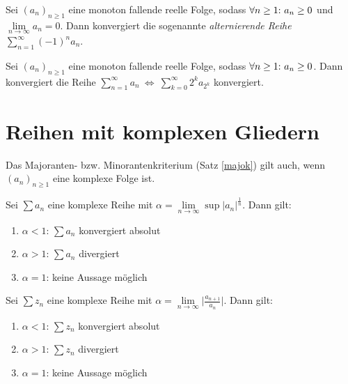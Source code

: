 \begin{framedthm}
	Sei $(a_n)_{n\geq 1}$ eine monoton fallende reelle Folge, sodass $\forall n \geq 1{:}\  a_n \geq 0$ und\\ $\lim\limits_{n \to \infty} a_n = 0$. Dann konvergiert die sogenannte \textit{alternierende Reihe} $\sum_{n=1}^{\infty} (-1)^n a_n$.
\end{framedthm}

\begin{framedthm}
	Sei $(a_n)_{n\geq 1}$ eine monoton fallende reelle Folge, sodass $\forall n \geq 1{:}\  a_n \geq 0$. Dann konvergiert die Reihe $\sum_{n=1}^{\infty} a_n \ \iff \ \sum_{k=0}^{\infty} 2^k a_{2^k}$ konvergiert.
\end{framedthm}

\section{Reihen mit komplexen Gliedern}

\begin{framedthm}
	Das Majoranten- bzw. Minorantenkriterium (Satz \ref{majok}) gilt auch, wenn $(a_n)_{n\geq 1}$ eine komplexe Folge ist.
\end{framedthm}

\begin{framedthm}
	Sei $\sum a_n$ eine komplexe Reihe mit $\alpha = \lim\limits_{n \to \infty} \sup |a_n|^{\frac{1}{n}}$. Dann gilt:
	\begin{enumerate}
		\item $\alpha < 1$: $\sum a_n$ konvergiert absolut
		\item $\alpha > 1$: $\sum a_n$ divergiert
		\item $\alpha = 1$: keine Aussage möglich
	\end{enumerate}
\end{framedthm}

\begin{framedthm}
	Sei $\sum z_n$ eine komplexe Reihe mit $\alpha = \lim\limits_{n \to \infty} \bigl| \frac{a_{n+1}}{a_n}\bigr|$. Dann gilt:
	\begin{enumerate}
		\item $\alpha < 1$: $\sum z_n$ konvergiert absolut
		\item $\alpha > 1$: $\sum z_n$ divergiert
		\item $\alpha = 1$: keine Aussage möglich
	\end{enumerate}
\end{framedthm}

